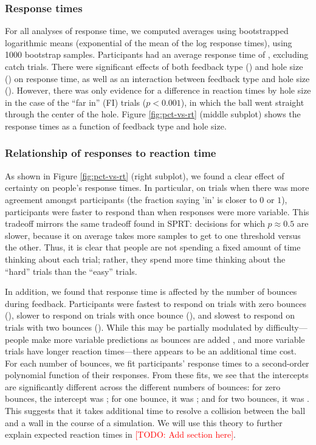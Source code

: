 \documentclass[10pt,letterpaper]{article}
\newcommand{\TODO}[1]{\textcolor{red}{[TODO: #1]}}
\begin{document}
\subsubsection{Response times}

For all analyses of response time, we computed averages using bootstrapped logarithmic means (exponential of the mean of the log response times), using 1000 bootstrap samples.
Participants had an average response time of \AvgRT{}, excluding catch trials.
There were significant effects of both feedback type (\RTHoleClass{}) and hole size (\RTHoleSize{}) on response time, as well as an interaction between feedback type and hole size (\RTFull{}).
However, there was only evidence for a difference in reaction times by hole size in the case of the ``far in'' (FI) trials ($p<0.001$), in which the ball went straight through the center of the hole.
Figure \ref{fig:pct-vs-rt} (middle subplot) shows the response times as a function of feedback type and hole size.

\subsubsection{Relationship of responses to reaction time}

As shown in Figure \ref{fig:pct-vs-rt} (right subplot), we found a clear effect of certainty on people's response times.
In particular, on trials when there was more agreement amongst participants (the fraction saying 'in' is closer to $0$ or $1$), participants were faster to respond than when responses were more variable.
This tradeoff mirrors the same tradeoff found in SPRT: decisions for which $p\approx0.5$ are slower, because it on average takes more samples to get to one threshold versus the other.
Thus, it is clear that people are not spending a fixed amount of time thinking about each trial; rather, they spend more time thinking about the ``hard'' trials than the ``easy'' trials.

In addition, we found that response time is affected by the number of bounces during feedback.
Participants were fastest to respond on trials with zero bounces (\RTZeroBounces{}), slower to respond on trials with once bounce (\RTOneBounces{}), and slowest to respond on trials with two bounces (\RTTwoBounces{}).
While this may be partially modulated by difficulty---people make more variable predictions as bounces are added \cite{Smith:2013fc}, and more variable trials have longer reaction times---there appears to be an additional time cost.
For each number of bounces, we fit participants' response times to a second-order polynomial function of their responses.
From these fits, we see that the intercepts are significantly different across the different numbers of bounces: for zero bounces, the intercept was \InterceptZeroBounces{}; for one bounce, it was \InterceptOneBounces{}; and for two bounces, it was \InterceptTwoBounces{}.
This suggests that it takes additional time to resolve a collision between the ball and a wall in the course of a simulation.
We will use this theory to further explain expected reaction times in \TODO{Add section here}.
\end{document}
